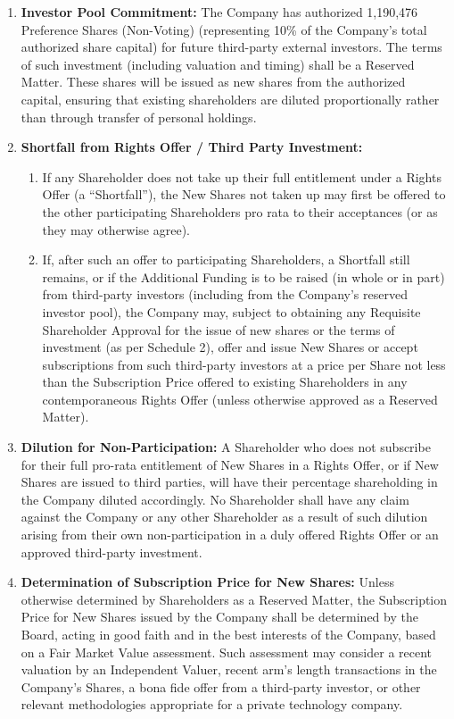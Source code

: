 \begin{enumerate}[label=(\alph*)]
\item \textbf{Investor Pool Commitment:} The Company has authorized 1,190,476 Preference Shares (Non-Voting) (representing 10\% of the Company's total authorized share capital) for future third-party external investors. The terms of such investment (including valuation and timing) shall be a Reserved Matter. These shares will be issued as new shares from the authorized capital, ensuring that existing shareholders are diluted proportionally rather than through transfer of personal holdings.
\item \textbf{Shortfall from Rights Offer / Third Party Investment:}
    \begin{enumerate}[label=(\roman*)]
    \item If any Shareholder does not take up their full entitlement under a Rights Offer (a ``Shortfall''), the New Shares not taken up may first be offered to the other participating Shareholders pro rata to their acceptances (or as they may otherwise agree).
    \item If, after such an offer to participating Shareholders, a Shortfall still remains, or if the Additional Funding is to be raised (in whole or in part) from third-party investors (including from the Company's reserved investor pool), the Company may, subject to obtaining any Requisite Shareholder Approval for the issue of new shares or the terms of investment (as per Schedule 2), offer and issue New Shares or accept subscriptions from such third-party investors at a price per Share not less than the Subscription Price offered to existing Shareholders in any contemporaneous Rights Offer (unless otherwise approved as a Reserved Matter).
    \end{enumerate}
\item \textbf{Dilution for Non-Participation:} A Shareholder who does not subscribe for their full pro-rata entitlement of New Shares in a Rights Offer, or if New Shares are issued to third parties, will have their percentage shareholding in the Company diluted accordingly. No Shareholder shall have any claim against the Company or any other Shareholder as a result of such dilution arising from their own non-participation in a duly offered Rights Offer or an approved third-party investment.
\item \textbf{Determination of Subscription Price for New Shares:} Unless otherwise determined by Shareholders as a Reserved Matter, the Subscription Price for New Shares issued by the Company shall be determined by the Board, acting in good faith and in the best interests of the Company, based on a Fair Market Value assessment. Such assessment may consider a recent valuation by an Independent Valuer, recent arm's length transactions in the Company's Shares, a bona fide offer from a third-party investor, or other relevant methodologies appropriate for a private technology company.

\end{enumerate}
